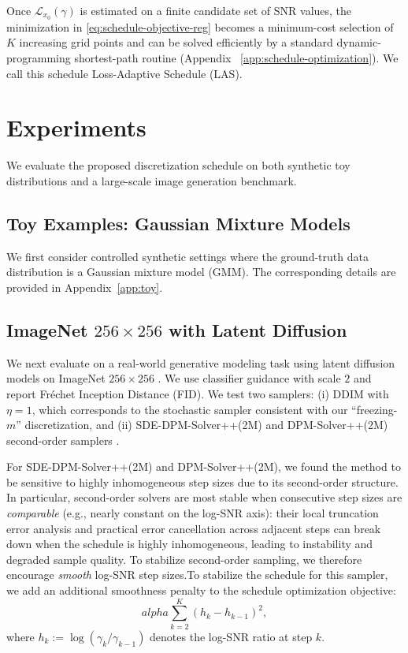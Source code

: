 \documentclass[11pt]{article}
\def\alpha{alpha}%
\def\times{×}%
\theoremstyle{definition}
\numberwithin{equation}{section}
\begin{document}
Once $\mathcal L_{x_0}(\gamma)$ is estimated on a finite candidate set of SNR values, the minimization in
\eqref{eq:schedule-objective-reg} becomes a minimum-cost selection of $K$ increasing grid points and can be solved
efficiently by a standard dynamic-programming shortest-path routine (Appendix ~\ref{app:schedule-optimization}). We call this schedule Loss-Adaptive Schedule (LAS).

\section{Experiments}
\label{sec:experiments}

We evaluate the proposed discretization schedule on both synthetic toy distributions and a large-scale image
generation benchmark. 

\subsection{Toy Examples: Gaussian Mixture Models}
We first consider controlled synthetic settings where the ground-truth data distribution is a Gaussian mixture
model (GMM). The corresponding
details are provided in Appendix~\ref{app:toy}.


\subsection{ImageNet $256\times256$ with Latent Diffusion}
We next evaluate on a real-world generative modeling task using latent diffusion models on ImageNet
$256\times256$ \cite{rombach2022high}. We use classifier guidance with scale $2$ and report Fr\'echet Inception
Distance (FID). We test two samplers:
(i) DDIM with $\eta=1$, which corresponds to the stochastic sampler consistent with our ``freezing-$m$''
discretization,
and (ii) SDE-DPM-Solver++(2M) and DPM-Solver++(2M)  second-order samplers \cite{lu2025dpm}.



For SDE-DPM-Solver++(2M) and DPM-Solver++(2M), we found the method to be sensitive to highly inhomogeneous step sizes due to its second-order
structure. In particular, second-order solvers are most stable when consecutive step sizes are \emph{comparable} (e.g., nearly
constant on the log-SNR axis): their local truncation error analysis and practical error cancellation across
adjacent steps can break down when the schedule is highly inhomogeneous, leading to instability and degraded
sample quality. To stabilize second-order sampling, we therefore encourage \emph{smooth} log-SNR step sizes.To stabilize the schedule for this sampler, we add an additional smoothness penalty to the schedule
optimization objective:
\begin{equation}
\alpha \sum_{k=2}^{K} (h_k - h_{k-1})^2,
\end{equation}
where $h_k := \log(\gamma_k/\gamma_{k-1})$ denotes the log-SNR ratio at step $k$. 
\end{document}
